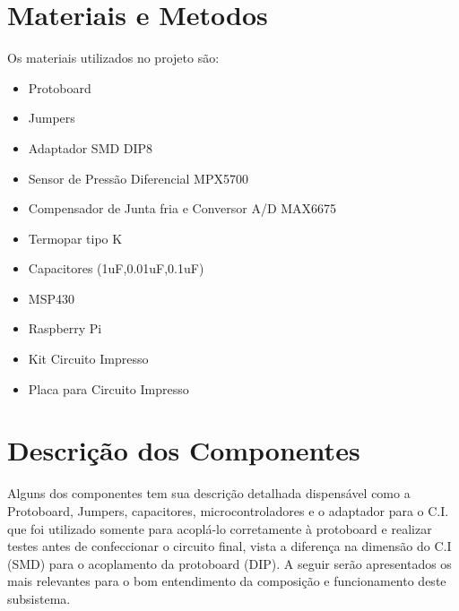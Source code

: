 \section{Materiais e Metodos}
Os materiais utilizados no projeto são:
\begin{itemize}
	\item Protoboard
	\item Jumpers
	\item Adaptador SMD DIP8
	\item Sensor de Pressão Diferencial MPX5700
	\item Compensador de Junta fria e Conversor A/D MAX6675
	\item Termopar tipo K
	\item Capacitores (1uF,0.01uF,0.1uF)
	\item MSP430
	\item Raspberry Pi 
	\item Kit Circuito Impresso
	\item Placa para Circuito Impresso
	
\end{itemize}

\section{Descrição dos Componentes}
Alguns dos componentes tem sua descrição detalhada dispensável como a Protoboard, Jumpers, capacitores, microcontroladores e o adaptador para o C.I. que foi utilizado somente para acoplá-lo corretamente à protoboard e realizar testes antes de confeccionar o circuito final, vista a diferença na dimensão do C.I (SMD) para o acoplamento da protoboard (DIP). A seguir serão apresentados os mais relevantes para o bom entendimento da composição e funcionamento deste subsistema.

